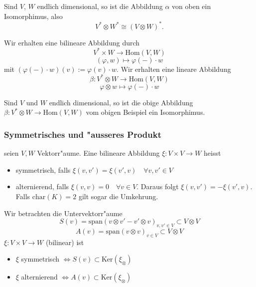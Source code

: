\documentclass[8pt, a4paper, twocolumn, landscape]{article}
\begin{document}
{{\begin{example}
\end{example}


\begin{theorem}
Sind $V$, $W$ endlich dimensional, so ist die Abbildung $\alpha$ von oben ein Isomorphimus, also 
$$
V^* \otimes W^* \cong (V \otimes W)^*.
$$
\end{theorem}

\begin{example}
Wir erhalten eine bilineare Abbildung durch 
$$
V^* \times W \rightarrow \mathrm{Hom}(V,W)
$$
$$
(\varphi, w) \mapsto \varphi (-) \cdot w
$$
mit  $ (\varphi (-) \cdot w) (v) := \varphi (v) \cdot w$.
Wir erhalten eine lineare Abbildung 
$$
\beta: V^* \otimes W \rightarrow \mathrm{Hom}(V, W)
$$
$$
\varphi \otimes w \mapsto \varphi (-) \cdot w
$$
\end{example}

\begin{theorem}
Sind $V$ und $W$ endlich dimensional, so ist die obige Abbildung $\beta:V^* \otimes W \rightarrow \mathrm{Hom}(V, W)$ vom obigen Beispiel ein Isomorphimus. 
\end{theorem}
}


\subsubsection{Symmetrisches und "ausseres Produkt}
\begin{definition}
seien $V, W$ Vektorr"aume.
Eine bilineare Abbildung 
$
\xi : V \times V \rightarrow W
$
heisst 
\begin{itemize}
\item symmetrisch, falls $\xi( v, v') = \xi (v', v) \quad \forall v, v' \in V$
\item alternierend, falls $\xi (v, v) = 0 \quad \forall v \in V$. Daraus folgt $\xi(v, v') = - \xi(v' ,v)$. Falls  $\mathrm{char}(K) = 2$ gilt  sogar die Umkehrung.
\end{itemize}
\end{definition}
\begin{lemma}
Wir betrachten die Untervektorr"aume 
$$
S(v) = \mathrm{span} (v \otimes v' - v' \otimes v)_{v, v' \in V} \subset V \otimes V
$$
$$
A(v) =  \mathrm{span} (v \otimes v)_{v \in V} \subset V \otimes V
$$
$\xi : V \times V \rightarrow W$ (bilinear) ist 
\begin{itemize}
\item $\xi$ symmetrisch $\Leftrightarrow S(v) \subset \mathrm{Ker}(\xi_\otimes)$
\item $\xi$ alternierend $\Leftrightarrow A(v) \subset \mathrm{Ker}(\xi_\otimes)$
\end{itemize}
\end{lemma}


}
\end{document}
